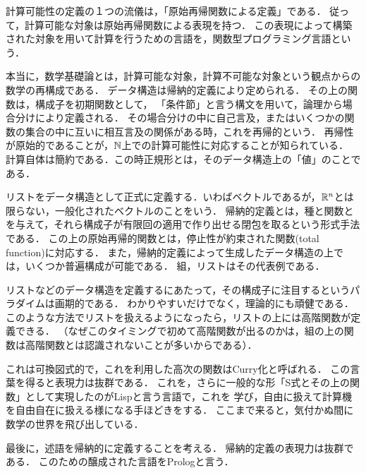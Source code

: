 \documentclass[uplatex, dvipdfmx]{jsreport}
\begin{document}
\begin{screen}
計算可能性の定義の１つの流儀は，「原始再帰関数による定義」である．
従って，計算可能な対象は原始再帰関数による表現を持つ．
この表現によって構築された対象を用いて計算を行うための言語を，関数型プログラミング言語という．

本当に，数学基礎論とは，計算可能な対象，計算不可能な対象という観点からの数学の再構成である．
データ構造は帰納的定義により定められる．
その上の関数は，構成子を初期関数として，
「条件節」と言う構文を用いて，論理から場合分けにより定義される．
その場合分けの中に自己言及，またはいくつかの関数の集合の中に互いに相互言及の関係がある時，これを再帰的という．
再帰性が原始的であることが，$\mathbb{N}$上での計算可能性に対応することが知られている．
計算自体は簡約である．この時正規形とは，そのデータ構造上の「値」のことである．

リストをデータ構造として正式に定義する．いわばベクトルであるが，$\mathbb{R}^n$とは限らない，一般化されたベクトルのことをいう．
帰納的定義とは，種と関数とを与えて，それら構成子が有限回の適用で作り出せる閉包を取るという形式手法である．
この上の原始再帰的関数とは，停止性が約束された関数(total function)に対応する．
また，帰納的定義によって生成したデータ構造の上では，いくつか普遍構成が可能である．
組，リストはその代表例である．

リストなどのデータ構造を定義するにあたって，その構成子に注目するというパラダイムは画期的である．
わかりやすいだけでなく，理論的にも頑健である．
このような方法でリストを扱えるようになったら，リストの上には高階関数が定義できる．
（なぜこのタイミングで初めて高階関数が出るのかは，組の上の関数は高階関数とは認識されないことが多いからである）．
\begin{center}
\end{center}
これは可換図式的で，これを利用した高次の関数はCurry化と呼ばれる．
この言葉を得ると表現力は抜群である．
これを，さらに一般的な形「S式とその上の関数」として実現したのがLispと言う言語で，これを
学び，自由に扱えて計算機を自由自在に扱える様になる手ほどきをする．
ここまで来ると，気付かぬ間に数学の世界を飛び出している．

最後に，述語を帰納的に定義することを考える．
帰納的定義の表現力は抜群である．
このための醸成された言語をPrologと言う．


\end{screen}
\end{document}
